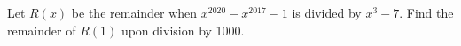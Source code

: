Let $R(x)$ be the remainder when $x^{2020}-x^{2017}-1$ is divided by $x^3-7$. Find the remainder of $R(1)$ upon division by 1000.
